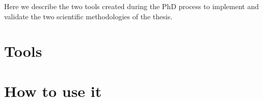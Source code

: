%
Here we describe the two tools created during the PhD process to implement and validate the two scientific methodologies of the thesis.

\section{Tools}

\section{How to use it}


